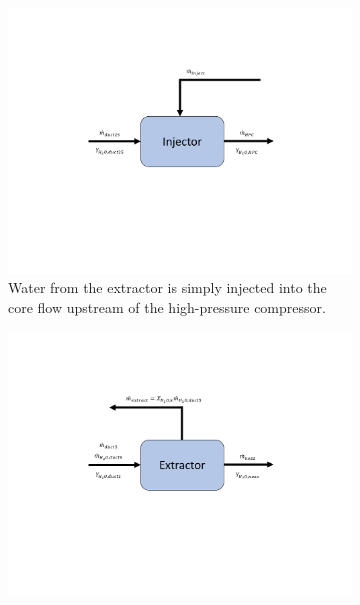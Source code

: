 \documentclass[conf]{new-aiaa}
\begin{document}
\begin{figure}[hbt!]
    \centering
    \begin{subfigure}[t]{0.49\textwidth}
        \includegraphics[width=\textwidth]{injector.pdf}
        \caption{
            Water from the extractor is simply injected into the core flow upstream of the high-pressure compressor.
        }
        \label{fig:injector}
    \end{subfigure}
    \hspace{2pt}
    \begin{subfigure}[t]{0.49\textwidth}
        \includegraphics[width=\textwidth]{extractor.pdf}

\end{subfigure}
\end{figure}
\end{document}
